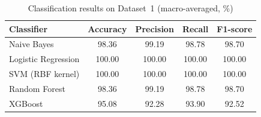 \begin{table}[H]
\centering
\caption{Classification results on Dataset~1 (macro-averaged, \%)}
\label{tab:results_dataset1}
\begin{tabular}{@{}lcccc@{}}
\toprule
\textbf{Classifier} & \textbf{Accuracy} & \textbf{Precision} & \textbf{Recall} & \textbf{F1-score} \\
\midrule
Naive Bayes                  & 98.36 & 99.19 & 98.78 & 98.70 \\
Logistic Regression          & 100.00 & 100.00 & 100.00 & 100.00 \\
SVM (RBF kernel)             & 100.00 & 100.00 & 100.00 & 100.00 \\
Random Forest                & 98.36 & 99.19 & 98.78 & 98.70 \\
XGBoost                      & 95.08 & 92.28 & 93.90 & 92.52 \\
\bottomrule
\end{tabular}
\end{table}
